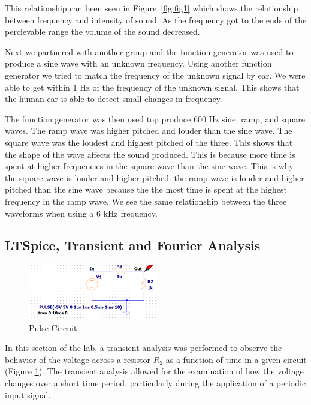 \documentclass{article}
\begin{document}
This relationship can been seen in Figure~\ref{fig:fig1} which shows the relationship between frequency and intensity of sound.
As the frequency got to the ends of the percievable range the volume of the sound decreased.
\newline

Next we partnered with another group and the function generator was used to produce a sine wave with an unknown frequency.
Using another function generator we tried to match the frequency of the unknown signal by ear. We were able to get within 1 Hz of the
frequency of the unknown signal. This shows that the human ear is able to detect small changes in frequency.
\newline

The function generator was then used top produce 600 Hz sine, ramp, and square waves. The ramp wave was higher pitched and louder than the sine wave.
The square wave was the loudest and highest pitched of the three. This shows that the shape of the wave affects the sound produced.
This is because more time is spent at higher frequencies in the square wave than the sine wave. This is why 
the square wave is louder and higher pitched. the ramp wave is louder and higher pitched than the sine wave because the 
the most time is spent at the highest frequency in the ramp wave. We see the same relationship between the three waveforms when using
a 6 kHz frequency.
\newline

\subsection{LTSpice, Transient and Fourier Analysis}
\begin{figure}[H]
	\centering
	\includegraphics[width=0.5\textwidth]{21Circuit.png}
	\caption{Pulse Circuit}
	\label{fig:fig2}
\end{figure}

In this section of the lab, a transient analysis was performed to observe the
behavior of the voltage across a resistor $R_2$
as a function of time in a given circuit (Figure \ref{fig:fig2}). The transient analysis allowed for the
examination of how the voltage changes over a short time period, particularly
during the application of a periodic input signal. 
\newline
\end{document}
